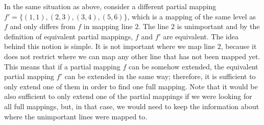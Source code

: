 In the same situation as above, consider a different partial mapping $f'=\{(1,1),(2,3),(3,4),(5,6)\}$, which is a mapping of the same level as $f$ and only differs from $f$ in mapping line $2$. The line $2$ is unimportant and by the definition of equivalent partial mappings, $f$ and $f'$ are equivalent. The idea behind this notion is simple. It is not important where we map line $2$, because it does not restrict where we can map any other line that has not been mapped yet. This means that if a partial mapping $f$ can be somehow extended, the equivalent partial mapping $f'$ can be extended in the same way; therefore, it is sufficient to only extend one of them in order to find one full mapping. Note that it would be also sufficient to only extend one of the partial mappings if we were looking for all full mappings, but, in that case, we would need to keep the information about where the unimportant lines were mapped to.